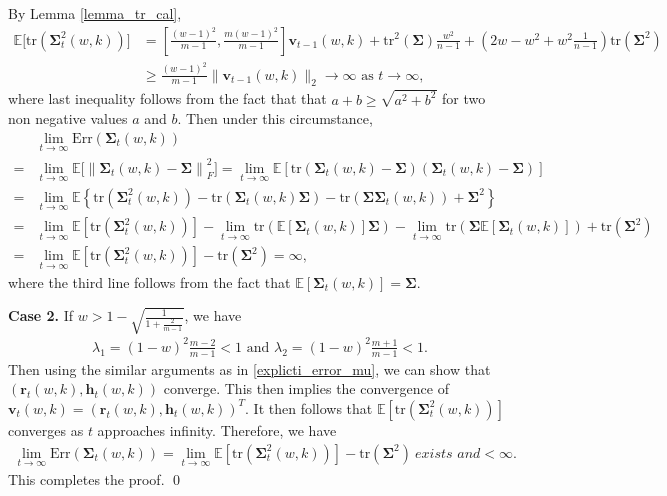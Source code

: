 By Lemma \ref{lemma_tr_cal}, 
\begin{align*}
\mathbb{E}\bigl[\mathrm{tr}(\bm{\Sigma}_t^2(w,k))\bigr]&=\left[\frac{(w - 1)^2}{m-1}, \frac{m(w - 1)^2}{m - 1}\right]\bm{v}_{t-1}(w,k)+ \mathrm{tr}^2(\bm{\Sigma})\frac{w^2}{n-1}+(2w-w^2+w^2\frac{1}{n-1})\mathrm{tr}(\bm{\Sigma}^2) \\ &\geq \frac{(w-1)^2}{m-1} \| \bm{v}_{t-1}(w,k)\|_2 \to \infty \mbox{ as } t\rightarrow \infty,
\end{align*}
where last inequality follows from the fact that that $a+b \geq \sqrt{a^2+b^2} $ for two non negative values $a$ and $b$. Then under this circumstance,
\begin{align*}
&\lim_{t\to \infty}\mathrm{Err}(\bm{\Sigma}_{t}(w,k)) \\
=& \lim_{t \to \infty}\mathbb{E}\big[\left\|\bm{\Sigma}_{t}(w,k) - \bm{\Sigma}\right \|^2_F\big]=\lim_{t \to \infty}\mathbb{E}\left[\mathrm{tr}(\bm{\Sigma}_{t}(w,k) - \bm{\Sigma})(\bm{\Sigma}_{t}(w,k) - \bm{\Sigma})\right] \\ 
=&\lim_{t \to \infty}\mathbb{E} \left\{ 
\mathrm{tr}(\bm{\Sigma}^2_t(w,k))-\mathrm{tr}(\bm{\Sigma}_{t}(w,k)\bm{\Sigma})-\mathrm{tr}(\bm{\Sigma}\bm{\Sigma}_t(w,k))+\bm{\Sigma}^2
\right\} 
\\  =&\lim_{t \to \infty}\mathbb{E}\left[\mathrm{tr}(\bm{\Sigma}^2_t(w,k))\right]-\lim_{t \to \infty}\mathrm{tr}(\mathbb{E}\left[\bm{\Sigma}_{t}(w,k)\right]\bm{\Sigma})-\lim_{t\to\infty}\mathrm{tr}(\bm{\Sigma}\mathbb{E}\left[
\bm{\Sigma}_t(w,k)
\right]) +\mathrm{tr}(\bm{\Sigma}^2)
\\  =&\lim_{t \to \infty}\mathbb{E}\left[\mathrm{tr}(\bm{\Sigma}^2_t(w,k))\right]-\mathrm{tr}(\bm{\Sigma}^2)=\infty,
\end{align*}
where the third line follows from the fact that $\mathbb{E}\left[\bm{\Sigma}_t(w,k) \right]=\bm{\Sigma}$.

\noindent
\textbf{Case 2.} If $w>1-\sqrt{\frac{1}{1+\frac{2}{m-1}}}$, we have
\begin{align*}
\lambda_1 = (1-w)^2 \frac{m-2}{m-1}<1 \mbox{ and }
\lambda_2=(1-w)^2 \frac{m+1}{m-1}< 1.
\end{align*}
Then using the similar arguments as in \eqref{explicti_error_mu}, we can show that $(\bm{r}_t(w,k),\bm{h}_t(w,k))$ converge. This then implies the convergence of $\bm{v}_t(w,k)=(\bm{r}_t(w,k),\bm{h}_t(w,k))^T$. It then follows that $\mathbb{E}\left[\mathrm{tr}(\bm{\Sigma}^2_t(w,k))\right]$ converges as $t$ approaches infinity. Therefore, we have
\begin{align*}
\lim_{t\to \infty}\mathrm{Err}(\bm{\Sigma}_{t}(w,k))=\lim_{t \to \infty}\mathbb{E}\left[\mathrm{tr}(\bm{\Sigma}^2_t(w,k))\right]-\mathrm{tr}(\bm{\Sigma}^2) \ \textit{exists and} <\infty.
\end{align*}
This completes the proof. \qed \\


